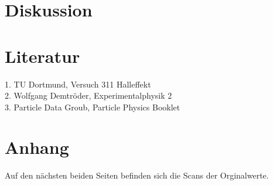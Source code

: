\section{Diskussion}
\label{Diskussion}

\section{Literatur}
\label{Literatur}
1. TU Dortmund, Versuch 311 Halleffekt\\
2. Wolfgang Demtröder, Experimentalphysik 2\\
3. Particle Data Groub, Particle Physics Booklet

\section{Anhang}
\label{sec:Anhang}
Auf den nächsten beiden Seiten befinden sich die Scans der Orginalwerte. 